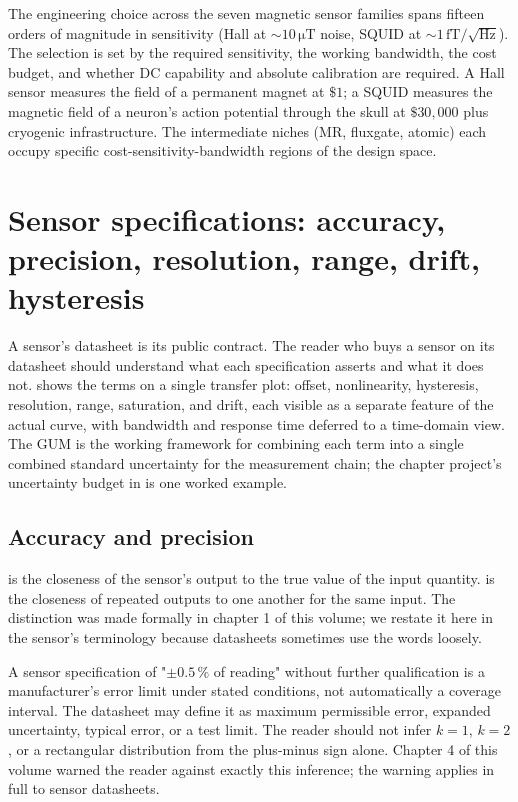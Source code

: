 The engineering choice across the seven magnetic sensor families
spans fifteen orders of magnitude in sensitivity (Hall at $\sim
10\,\si{\micro\tesla}$ noise, SQUID at $\sim 1\,\si{\femto
\tesla}/\sqrt{\si{\hertz}}$). The selection is set by the
required sensitivity, the working bandwidth, the cost budget,
and whether DC capability and absolute calibration are required.
A Hall sensor measures the field of a permanent magnet at
$\$1$; a SQUID measures the magnetic field of a neuron's action
potential through the skull at $\$30{,}000$ plus cryogenic
infrastructure. The intermediate niches (MR, fluxgate, atomic)
each occupy specific cost-sensitivity-bandwidth regions of the
design space.

\section{Sensor specifications: accuracy, precision, resolution,
range, drift, hysteresis}

A sensor's datasheet is its public contract. The reader who buys a
sensor on its datasheet should understand what each specification
asserts and what it does not. 
shows the terms on a single transfer plot: offset, nonlinearity,
hysteresis, resolution, range, saturation, and drift, each visible
as a separate feature of the actual curve, with bandwidth and
response time deferred to a time-domain view. The GUM
\cite{std:ch05-jcgm-100} is the working framework for combining
each term into a single combined standard uncertainty for the
measurement chain; the chapter project's uncertainty budget in
 is one worked example.



\subsection{Accuracy and precision}

 is the closeness of the sensor's output to the
true value of the input quantity.  is the
closeness of repeated outputs to one another for the same input. The
distinction was made formally in chapter 1 of this volume; we
restate it here in the sensor's terminology because datasheets
sometimes use the words loosely.

A sensor specification of "$\pm 0.5\,\%$ of reading" without further
qualification is a manufacturer's error limit under stated
conditions, not automatically a coverage interval. The datasheet may
define it as maximum permissible error, expanded uncertainty,
typical error, or a test limit. The reader should not infer
$k = 1$, $k = 2$, or a rectangular distribution from the plus-minus
sign alone. Chapter 4 of this volume warned the reader against
exactly this inference; the warning applies in full to sensor
datasheets.

